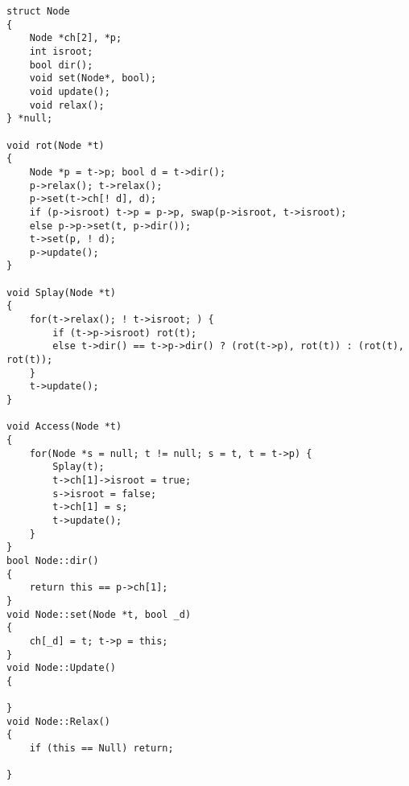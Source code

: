 \begin{lstlisting}
struct Node
{
	Node *ch[2], *p;
	int isroot;
	bool dir();
	void set(Node*, bool);
	void update();
	void relax();
} *null;

void rot(Node *t)
{
	Node *p = t->p; bool d = t->dir();
	p->relax(); t->relax();
	p->set(t->ch[! d], d);
	if (p->isroot) t->p = p->p, swap(p->isroot, t->isroot);
	else p->p->set(t, p->dir());
	t->set(p, ! d);
	p->update();
}

void Splay(Node *t)
{
	for(t->relax(); ! t->isroot; ) {
		if (t->p->isroot) rot(t);
		else t->dir() == t->p->dir() ? (rot(t->p), rot(t)) : (rot(t), rot(t));
	}
	t->update();
}

void Access(Node *t)
{
	for(Node *s = null; t != null; s = t, t = t->p) {
		Splay(t);
		t->ch[1]->isroot = true;
		s->isroot = false;
		t->ch[1] = s;
		t->update();
	}
}
bool Node::dir()
{
	return this == p->ch[1];
}
void Node::set(Node *t, bool _d)
{
	ch[_d] = t; t->p = this;
}
void Node::Update()
{

}
void Node::Relax()
{
	if (this == Null) return;

}
\end{lstlisting}

